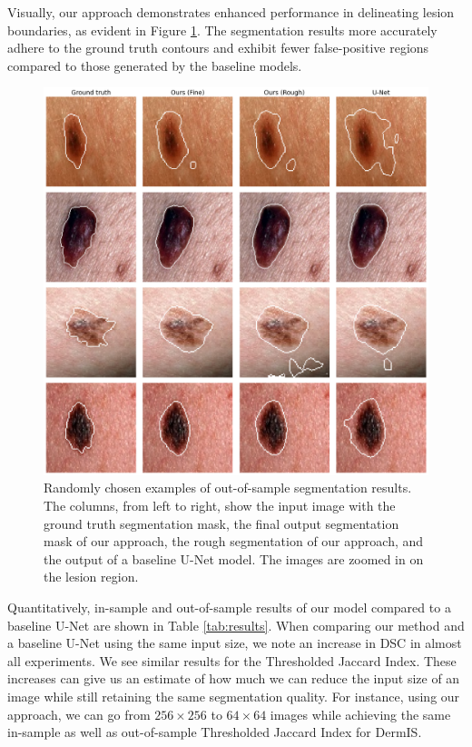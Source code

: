 Visually, our approach demonstrates enhanced performance in delineating lesion boundaries, as evident in Figure \ref{fig:visual}. The segmentation results more accurately adhere to the ground truth contours and exhibit fewer false-positive regions compared to those generated by the baseline models.

\begin{figure}[t!]
\centering
\includegraphics[width=\textwidth]{images/5/e2e/visual_results.png}
\caption{Randomly chosen examples of out-of-sample segmentation results. The columns, from left to right, show the input image with the ground truth segmentation mask, the final output segmentation mask of our approach, the rough segmentation of our approach, and the output of a baseline U-Net model. The images are zoomed in on the lesion region.} \label{fig:visual}
\end{figure}

Quantitatively, in-sample and out-of-sample results of our model compared to a baseline U-Net are shown in Table \ref{tab:results}. When comparing our method and a baseline U-Net using the same input size, we note an increase in DSC in almost all experiments. We see similar results for the Thresholded Jaccard Index. These increases can give us an estimate of how much we can reduce the input size of an image while still retaining the same segmentation quality. For instance, using our approach, we can go from $256 \times 256$ to $64 \times 64$ images while achieving the same in-sample as well as out-of-sample Thresholded Jaccard Index for DermIS.


